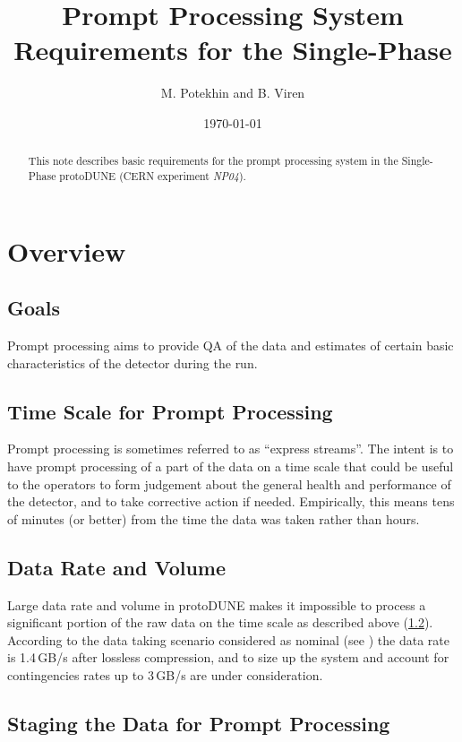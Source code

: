 \documentclass[pdftex,12pt,letter]{article}
\title{Prompt Processing System Requirements for the Single-Phase \pd}
\date{\today}
\author{M. Potekhin and B. Viren}
\newcommand{\pd}{protoDUNE\xspace}
\newcommand{\expname}{\textit{NP04}\xspace}
\begin{document}
\maketitle

\begin{abstract}
\noindent  This note describes basic requirements for the prompt processing system in the Single-Phase \pd
(CERN experiment \expname).
\end{abstract}

\section{Overview}
\subsection{Goals}
\label{sec:goals}
Prompt processing aims to provide QA of the data and estimates of certain  basic characteristics
of the detector during the run.


\subsection{Time Scale for Prompt Processing}
\label{sec:timescale}
 Prompt processing is sometimes referred to as ``express streams''.
The intent is to have prompt processing of a part of the data on a time scale that could be useful to the operators to
form judgement about the general health and performance of the detector, and to take corrective action if needed.
Empirically, this means tens of minutes (or better) from the time the data was taken rather than hours.

\subsection{Data Rate and Volume}
\label{sec:datavolume}
Large data rate and volume in \pd makes it impossible to process a significant portion of the raw data on the time scale
as described above (\ref{sec:timescale}).
According to the data taking scenario considered as nominal (see \cite{docdb1086})
the data rate is 1.4\,GB/s after lossless compression, and to size up
the system and account for contingencies rates up to 3\,GB/s are under consideration.

\subsection{Staging the Data for Prompt Processing}
\label{sec:datalocation}
\end{document}
